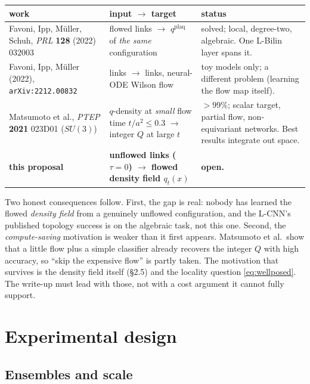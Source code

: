 \documentclass[11pt,a4paper]{article}
\newcommand{\qflow}{q_{t}}
\begin{document}
\begin{center}
\begin{tabular}{p{} p{} p{}}
\toprule
work & input $\to$ target & status \\
\midrule
Favoni, Ipp, M\"uller, Schuh, \emph{PRL} \textbf{128} (2022) 032003
 & flowed links $\to$ $q^{\mathrm{plaq}}$ of \emph{the same} configuration
 & solved; local, degree-two, algebraic. One L-Bilin layer spans it. \\[2pt]
Favoni, Ipp, M\"uller (2022), \texttt{arXiv:2212.00832}
 & links $\to$ links, neural-ODE Wilson flow
 & toy models only; a different problem (learning the flow map itself). \\[2pt]
Matsumoto et al., \emph{PTEP} \textbf{2021} 023D01 ($SU(3)$)
 & $q$-density at \emph{small} flow time $t/a^2 \le 0.3$ $\to$ integer $Q$ at large $t$
 & $>99\%$; scalar target, partial flow, non-equivariant networks. Best results integrate out space. \\[2pt]
\midrule
\textbf{this proposal}
 & \textbf{unflowed links ($\tau = 0$) $\to$ flowed density field $\qflow(x)$}
 & \textbf{open.} \\
\bottomrule
\end{tabular}
\end{center}

Two honest consequences follow. First, the gap is real: nobody has learned the
flowed \emph{density field} from a genuinely unflowed configuration, and the
L-CNN's published topology success is on the algebraic task, not this one.
Second, the \emph{compute-saving} motivation is weaker than it first appears.
Matsumoto et al.\ show that a little flow plus a simple classifier already
recovers the integer $Q$ with high accuracy, so ``skip the expensive flow'' is
partly taken. The motivation that survives is the density field itself
(\S2.5) and the locality question \eqref{eq:wellposed}. The write-up must lead
with those, not with a cost argument it cannot fully support.

\section{Experimental design}

\subsection{Ensembles and scale}
\end{document}
